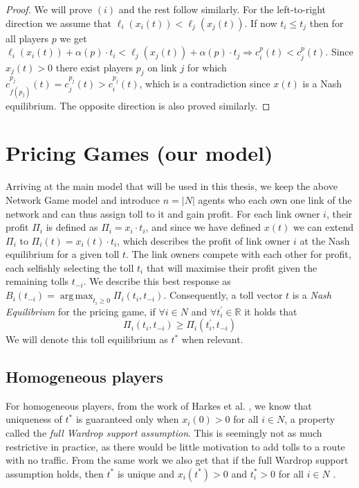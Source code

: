 \documentclass[10pt,a4paper]{book}
\newcommand{\R}{\mathbb{R}}
\DeclareMathOperator*{\argmax}{arg\,max}
\theoremstyle{definition}
\theoremstyle{comment}
\begin{document}
\begin{proof}
	We will prove $(i)$ and the rest follow similarly.
	For the left-to-right direction we assume that $\ell_i(x_i(t)) < \ell_j(x_j(t))$.
	If now $t_i \le t_j$ then for all players $p$ we get $\ell_i(x_i(t)) + \alpha(p) \cdot t_i < \ell_j(x_j(t)) + \alpha(p) \cdot t_j \Rightarrow c_i^p(t) < c_j^p(t)$.
	Since $x_j(t) > 0$ there exist players $p_j$ on link $j$ for which $c_{f(p_j)}^{p_j}(t) = c_j^{p_j}(t) > c_i^{p_j}(t)$, which is a contradiction since $x(t)$ is a Nash equilibrium.
	The opposite direction is also proved similarly.
\end{proof}

\section*{Pricing Games (our model)}

Arriving at the main model that will be used in this thesis, we keep the above Network Game model and introduce $n = |N|$ agents who each own one link of the network and can thus assign toll to it and gain profit.
For each link owner $i$, their profit $\Pi_i$ is defined as $\Pi_i = x_i \cdot t_i$, and since we have defined $x(t)$ we can extend $\Pi_i$ to $\Pi_i(t) = x_i(t) \cdot t_i$, which describes the profit of link owner $i$ at the Nash equilibrium for a given toll $t$.
The link owners compete with each other for profit, each selfishly selecting the toll $t_i$ that will maximise their profit given the remaining tolls $t_{-i}$.
We describe this best response as $B_i(t_{-i}) = \argmax_{t_i \geq 0} \Pi_i(t_i, t_{-i})$.
Consequently, a toll vector $t$ is a \textit{Nash Equilibrium} for the pricing game, if $\forall i \in N$ and $\forall t_i^\prime \in \R$ it holds that
\[\Pi_i(t_i, t_{-i}) \geq \Pi_i(t_i^\prime, t_{-i})\]
We will denote this toll equilibrium as $t^*$ when relevant.

\subsection*{Homogeneous players}

For homogeneous players, from the work of Harkes et al. \cite[Example 4.2]{Harks_2019}, we know that uniqueness of $t^*$ is guaranteed only when $x_i(0) > 0$ for all $i \in N$, a property called the \textit{full Wardrop support assumption}.
This is seemingly not as much restrictive in practice, as there would be little motivation to add tolls to a route with no traffic.
From the same work we also get that if the full Wardrop support assumption holds, then $t^*$ is unique \cite[Lemma 3.3]{Harks_2019} and $x_i(t^*) > 0$ and $t_i^* > 0$ for all $i \in N$ \cite[Lemma 3.2]{Harks_2019}.
\end{document}
